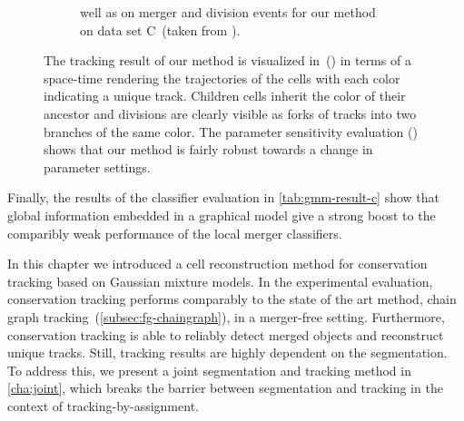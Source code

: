 \begin{figure}
\begin{subfigure}[t]{0.48\textwidth}
{            well as on merger and division events for our method on data set C~(taken from
            \citealp[Figure~6d]{schiegg_13_conservation}).}
        \label{fig:gmm-results-c-sensitivity}
    \end{subfigure}
    \caption[Visualization of the tracking results for data set C and parameter sensitivity]{The
        tracking result of our method is visualized in~() in
        terms of a space-time rendering the trajectories of the cells with each color indicating a
        unique track. Children cells inherit the color of their ancestor and divisions are clearly
        visible as forks of tracks into two branches of the same color. The parameter
        sensitivity evaluation () shows that our method is
        fairly robust towards a change in parameter settings.}
    \label{fig:gmm-results-c-vis-sensitivity}
\end{figure}




Finally, the results of the classifier evaluation in \cref{tab:gmm-result-c} show that global
information embedded in a graphical model give a strong boost to the comparibly weak performance of
the local merger classifiers.

In this chapter we introduced a cell reconstruction method for conservation tracking based on
Gaussian mixture models. In the experimental evaluation, conservation tracking performs comparably to
the state of the art method, chain graph tracking~(\cref{subsec:fg-chaingraph}), in a merger-free
setting. Furthermore, conservation tracking is able to reliably detect merged objects and
reconstruct unique tracks. Still, tracking results are highly dependent on the segmentation. To
address this, we present a joint segmentation and tracking method in \cref{cha:joint}, which breaks
the barrier between segmentation and tracking in the context of tracking-by-assignment.




